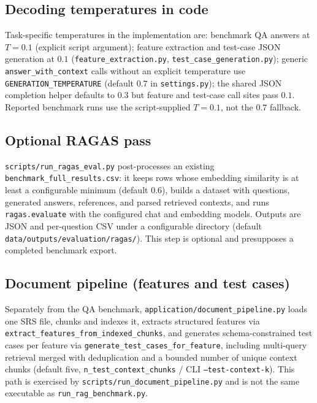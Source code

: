 \documentclass[conference]{IEEEtran}
\begin{document}
\subsection{Decoding temperatures in code}

Task-specific temperatures in the implementation are: benchmark QA answers at $T{=}0.1$ (explicit script argument); feature extraction and test-case JSON generation at $0.1$ (\texttt{feature\_extraction.py}, \texttt{test\_case\_generation.py}); generic \texttt{answer\_with\_context} calls without an explicit temperature use \texttt{GENERATION\_TEMPERATURE} (default $0.7$ in \texttt{settings.py}); the shared JSON completion helper defaults to $0.3$ but feature and test-case call sites pass $0.1$. Reported benchmark runs use the script-supplied $T{=}0.1$, not the $0.7$ fallback.

\subsection{Optional RAGAS pass}

\texttt{scripts/run\_ragas\_eval.py} post-processes an existing \texttt{benchmark\_full\_results.csv}: it keeps rows whose embedding similarity is at least a configurable minimum (default $0.6$), builds a dataset with questions, generated answers, references, and parsed retrieved contexts, and runs \texttt{ragas.evaluate} with the configured chat and embedding models. Outputs are JSON and per-question CSV under a configurable directory (default \texttt{data/outputs/evaluation/ragas/}). This step is optional and presupposes a completed benchmark export.

\subsection{Document pipeline (features and test cases)}

Separately from the QA benchmark, \texttt{application/document\_pipeline.py} loads one SRS file, chunks and indexes it, extracts structured features via \texttt{extract\_features\_from\_indexed\_chunks}, and generates schema-constrained test cases per feature via \texttt{generate\_test\_cases\_for\_feature}, including multi-query retrieval merged with deduplication and a bounded number of unique context chunks (default five, \texttt{n\_test\_context\_chunks} / CLI \texttt{--test-context-k}). This path is exercised by \texttt{scripts/run\_document\_pipeline.py} and is not the same executable as \texttt{run\_rag\_benchmark.py}.
\end{document}
